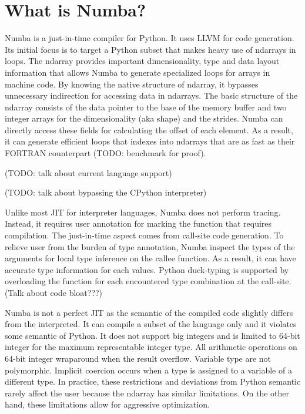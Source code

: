 \documentclass{acm_proc_article-sp}
\begin{document}
\section{What is Numba?}

Numba is a just-in-time compiler for Python.
It uses LLVM for code generation.
Its initial focus is to target a Python subset that makes heavy use of
ndarrays in loops.  The ndarray provides important dimensionality,
type and data layout information that allows Numba to generate specialized
loops for arrays in machine code. By knowing the native structure of ndarray,
it bypasses unnecessary indirection for accessing data in ndarrays.
The basic structure of the ndarray consists of the data pointer to the base of
the memory buffer and two integer arrays for the dimensionality (aka shape) and
the strides. Numba can directly access these fields for calculating the offset
of each element.  As a result, it can generate efficient loops that indexes
into ndarrays that are as fast as their FORTRAN counterpart
(TODO: benchmark for proof).

(TODO: talk about current language support)

(TODO: talk about bypassing the CPython interpreter)

Unlike most JIT for interpreter languages, Numba does not perform tracing.
Instead, it requires user annotation for marking the function that requires
compilation. The just-in-time aspect comes from call-site code generation.
To relieve user from the burden of type annotation, Numba inspect the types
of the arguments for local type inference on the callee function.
As a result, it can have accurate type information for each values.
Python duck-typing is supported by overloading the function for each
encountered type combination at the call-site. (Talk about code bloat???)

Numba is not a perfect JIT as the semantic of the compiled code slightly differs
from the interpreted. It can compile a subset of the language only
and it violates some semantic of Python.  It does not support big integers
and is limited to 64-bit integer for the maximum representable integer type.
All arithmetic operations on 64-bit integer wraparound when the result
overflow.  Variable type are not polymorphic.  Implicit coercion occurs when
a type is assigned to a variable of a different type. In practice, these
restrictions and deviations from Python semantic rarely affect the user
because the ndarray has similar limitations. On the other hand, these
limitations allow for aggressive optimization.
\end{document}

